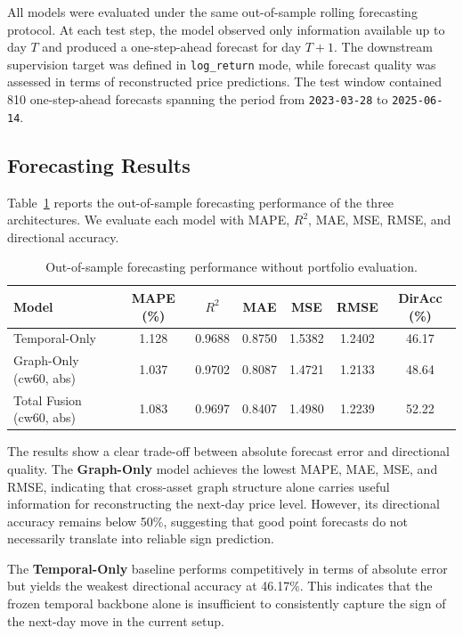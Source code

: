 All models were evaluated under the same out-of-sample rolling forecasting
protocol. At each test step, the model observed only information available up to
day $T$ and produced a one-step-ahead forecast for day $T+1$. The downstream
supervision target was defined in \texttt{log\_return} mode, while forecast
quality was assessed in terms of reconstructed price predictions. The test
window contained 810 one-step-ahead forecasts spanning the period from
\texttt{2023-03-28} to \texttt{2025-06-14}.

\subsection{Forecasting Results}

Table~\ref{tab:forecast-metrics} reports the out-of-sample forecasting
performance of the three architectures. We evaluate each model with MAPE,
$R^2$, MAE, MSE, RMSE, and directional accuracy.

\begin{table}[ht]
    \centering
    \caption{Out-of-sample forecasting performance without portfolio evaluation.}
    \label{tab:forecast-metrics}
    \begin{tabular}{lcccccc}
        \toprule
        \textbf{Model} & \textbf{MAPE (\%)} & \textbf{$R^2$} & \textbf{MAE} & \textbf{MSE} & \textbf{RMSE} & \textbf{DirAcc (\%)} \\
        \midrule
        Temporal-Only & 1.128 & 0.9688 & 0.8750 & 1.5382 & 1.2402 & 46.17 \\
        Graph-Only (cw60, abs) & 1.037 & 0.9702 & 0.8087 & 1.4721 & 1.2133 & 48.64 \\
        Total Fusion (cw60, abs) & 1.083 & 0.9697 & 0.8407 & 1.4980 & 1.2239 & 52.22 \\
        \bottomrule
    \end{tabular}
\end{table}

The results show a clear trade-off between absolute forecast error and
directional quality. The \textbf{Graph-Only} model achieves the lowest MAPE,
MAE, MSE, and RMSE, indicating that cross-asset graph structure alone carries
useful information for reconstructing the next-day price level. However, its
directional accuracy remains below 50\%, suggesting that good point forecasts do
not necessarily translate into reliable sign prediction.

The \textbf{Temporal-Only} baseline performs competitively in terms of absolute
error but yields the weakest directional accuracy at 46.17\%. This indicates
that the frozen temporal backbone alone is insufficient to consistently capture
the sign of the next-day move in the current setup.

